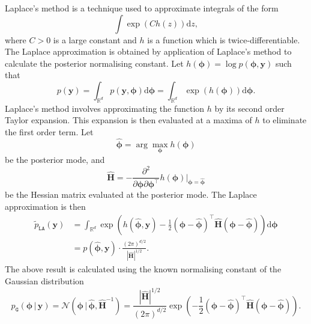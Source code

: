 \documentclass[a4paper, nobind]{templates/ociamthesis}
\begin{document}
Laplace's method \autocite{laplace1774memoire} is a technique used to approximate integrals of the form
\begin{equation}
\int \exp(C h(z)) \text{d}z,
\end{equation}
where \(C > 0\) is a large constant and \(h\) is a function which is twice-differentiable.
The Laplace approximation \autocite{tierney1986accurate} is obtained by application of Laplace's method to calculate the posterior normalising constant.
Let \(h(\boldsymbol{\mathbf{\phi}}) = \log p(\boldsymbol{\mathbf{\phi}}, \mathbf{y})\) such that
\begin{equation}
p(\mathbf{y}) = \int_{\mathbb{R}^d} p(\mathbf{y}, \boldsymbol{\mathbf{\phi}}) \text{d}\boldsymbol{\mathbf{\phi}} = \int_{\mathbb{R}^d} \exp(h(\boldsymbol{\mathbf{\phi}})) \text{d}\boldsymbol{\mathbf{\phi}}.
\end{equation}
Laplace's method involves approximating the function \(h\) by its second order Taylor expansion.
This expansion is then evaluated at a maxima of \(h\) to eliminate the first order term.
Let
\begin{equation}
\hat{\boldsymbol{\mathbf{\phi}}} = \arg\max_{\boldsymbol{\mathbf{\phi}}} h(\boldsymbol{\mathbf{\phi}})
\end{equation}
be the posterior mode, and
\begin{equation}
\hat {\mathbf{H}} = - \frac{\partial^2}{\partial \boldsymbol{\mathbf{\phi}} \partial \boldsymbol{\mathbf{\phi}}^\top} h(\boldsymbol{\mathbf{\phi}}) \rvert_{\boldsymbol{\mathbf{\phi}} = \hat{\boldsymbol{\mathbf{\phi}}}}
\end{equation}
be the Hessian matrix evaluated at the posterior mode.
The Laplace approximation is then
\begin{align}
\tilde p_{\texttt{LA}}(\mathbf{y}) &= \int_{\mathbb{R}^d} \exp \left( h(\hat{\boldsymbol{\mathbf{\phi}}}, \mathbf{y}) - \frac{1}{2} (\boldsymbol{\mathbf{\phi}} - \hat{\boldsymbol{\mathbf{\phi}}})^\top \hat {\mathbf{H}} (\boldsymbol{\mathbf{\phi}} - \hat{\boldsymbol{\mathbf{\phi}}}) \right) \text{d}\boldsymbol{\mathbf{\phi}} \label{eq:la} \\
&= p(\hat{\boldsymbol{\mathbf{\phi}}}, \mathbf{y}) \cdot \frac{(2 \pi)^{d/2}}{| \hat {\mathbf{H}} |^{1/2}}.
\end{align}
The above result is calculated using the known normalising constant of the Gaussian distribution
\begin{equation}
p_\texttt{G}(\boldsymbol{\mathbf{\phi}} \, | \, \mathbf{y}) = \mathcal{N}(\boldsymbol{\mathbf{\phi}} \, | \, \hat{\boldsymbol{\mathbf{\phi}}}, \hat {\mathbf{H}}^{-1}) = \frac{| \hat {\mathbf{H}} |^{1/2}}{(2 \pi)^{d/2}} \exp \left( - \frac{1}{2} (\boldsymbol{\mathbf{\phi}} - \hat{\boldsymbol{\mathbf{\phi}}})^\top \hat {\mathbf{H}} (\boldsymbol{\mathbf{\phi}} - \hat{\boldsymbol{\mathbf{\phi}}}) \right).
\end{equation}
\end{document}
